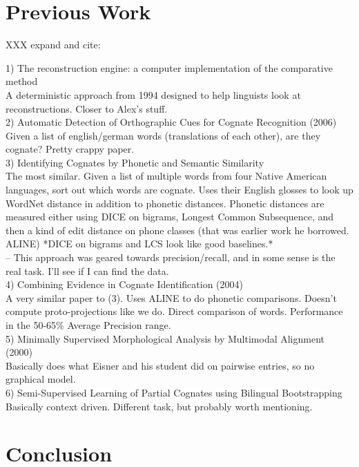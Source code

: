 \documentclass[11pt,a4paper]{article}
\begin{document}
\section{Previous Work}
XXX expand and cite:

1) The reconstruction engine: a computer implementation of the
comparative method\\
  A deterministic approach from 1994 designed to help linguists look
at reconstructions. Closer to Alex's stuff. \\
2) Automatic Detection of Orthographic Cues for Cognate Recognition (2006) \\
  Given a list of english/german words (translations of each other),
are they cognate? Pretty crappy paper.\\
3) Identifying Cognates by Phonetic and Semantic Similarity \\
  The most similar. Given a list of multiple words from four Native
American languages, sort out which words are cognate. Uses their
English glosses to look up WordNet distance in addition to phonetic
distances. Phonetic distances are measured either using DICE on
bigrams, Longest Common Subsequence, and then a kind of edit distance
on phone classes (that was earlier work he borrowed. ALINE) *DICE on
bigrams and LCS look like good baselines.*\\
  -- This approach was geared towards precision/recall, and in some
sense is the real task. I'll see if I can find the data. \\
4)  Combining Evidence in Cognate Identification (2004) \\
  A very similar paper to (3). Uses ALINE to do phonetic comparisons.
Doesn't compute proto-projections like we do. Direct comparison of
words. Performance in the 50-65\% Average Precision range.\\
5) Minimally Supervised Morphological Analysis by Multimodal Alignment (2000) \\
  Basically does what Eisner and his student did on pairwise entries,
so no graphical model.\\
6) Semi-Supervised Learning of Partial Cognates using Bilingual Bootstrapping
  Basically context driven. Different task, but probably worth mentioning.

\section{Conclusion}
\end{document}
